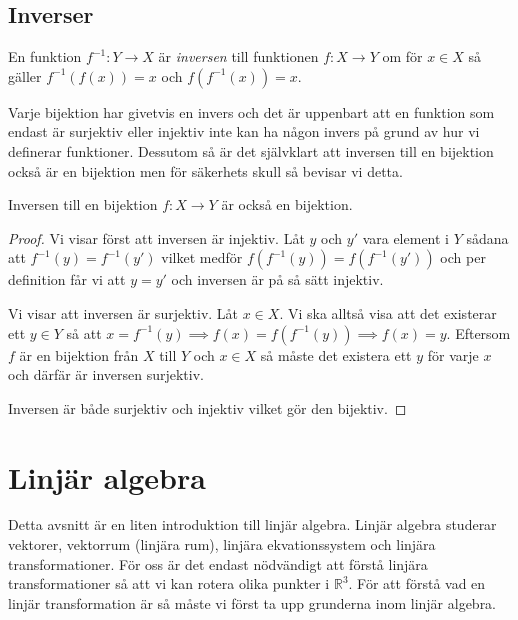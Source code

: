 \documentclass{article}
\theoremstyle{definition}
\begin{document}
\subsection{Inverser}
\begin{mydef}{}{}
  En funktion $f^{-1}: Y \rightarrow X$ är \textit{inversen} till funktionen 
  $f: X \rightarrow Y$ om för $x \in X$ så gäller $f^{-1}(f(x)) = x$ och $f(f^{-1}(x)) = x.$ 
\end{mydef}
Varje bijektion har givetvis en invers och det är uppenbart att en funktion som endast 
är surjektiv eller injektiv inte kan ha någon invers på grund av hur vi definerar funktioner. Dessutom så är det självklart att inversen 
till en bijektion också är en bijektion men för säkerhets skull så bevisar vi detta. 
\hypertarget{invbij}{}
\begin{mytheo}{}{}
  Inversen till en bijektion $f: X \rightarrow Y$ är också en bijektion.
\end{mytheo}
\begin{proof}
  Vi visar först att inversen är injektiv. Låt $y$ och $y'$ vara element i $Y$ sådana att 
  $f^{-1}(y) = f^{-1}(y')$ vilket medför $f(f^{-1}(y)) = f(f^{-1}(y'))$ och per definition 
  får vi att $y = y'$ och inversen är på så sätt injektiv.

  Vi visar att inversen är surjektiv.
  Låt $x \in X$. Vi ska alltså visa att det existerar ett $y \in Y$ så att 
  $x = f^{-1}(y) \implies f(x) = f(f^{-1}(y)) \implies f(x) = y.$ Eftersom 
  $f$ är en bijektion från $X$ till $Y$ och $x \in X$ så måste det existera ett $y$ för 
  varje $x$ och därfär är inversen surjektiv. 
  
  Inversen är både surjektiv och injektiv vilket gör den bijektiv.
\end{proof}

\section{Linjär algebra}
Detta avsnitt är en liten introduktion till linjär algebra. Linjär algebra studerar vektorer, vektorrum 
(linjära rum), linjära ekvationssystem och linjära transformationer. För oss är det endast nödvändigt 
att förstå linjära transformationer så att vi kan rotera olika punkter i $\mathbb{R}^3$. För att förstå 
vad en linjär transformation är så måste vi först ta upp grunderna inom linjär algebra. 

\end{document}
